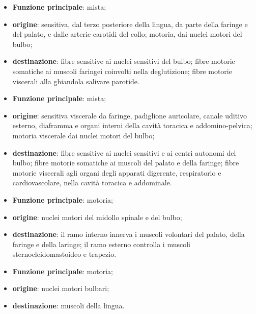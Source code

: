 \begin{itemize}
  \item \textbf{Funzione principale}: mista;
  \item \textbf{origine}: sensitiva, dal terzo posteriore della lingua, da
    parte della faringe e del palato, e dalle arterie carotidi del collo;
    motoria, dai nuclei motori del bulbo;
  \item \textbf{destinazione}: fibre sensitive ai nuclei sensitivi del
    bulbo; fibre motorie somatiche ai muscoli faringei coinvolti nella
    deglutizione; fibre motorie viscerali alla ghiandola salivare parotide.
\end{itemize}

\begin{itemize}
  \item \textbf{Funzione principale}: mista;
  \item \textbf{origine}: sensitiva viscerale da faringe, padiglione
    auricolare, canale uditivo esterno, diaframma e organi interni della
    cavità toracica e addomino-pelvica; motoria viscerale dai nuclei motori
    del bulbo;
  \item \textbf{destinazione}: fibre sensitive ai nuclei sensitivi e ai
    centri autonomi del bulbo; fibre motorie somatiche ai muscoli del
    palato e della faringe; fibre motorie viscerali agli organi degli
    apparati digerente, respiratorio e cardiovascolare, nella cavità
    toracica e addominale.
\end{itemize}

\begin{itemize}
  \item \textbf{Funzione principale}: motoria;
  \item \textbf{origine}: nuclei motori del midollo spinale e del bulbo;
  \item \textbf{destinazione}: il ramo interno innerva i muscoli volontari
    del palato, della faringe e della laringe; il ramo esterno controlla i
    muscoli sternocleidomastoideo e trapezio.
\end{itemize}

\begin{itemize}
  \item \textbf{Funzione principale}: motoria;
  \item \textbf{origine}: nuclei motori bulbari;
  \item \textbf{destinazione}: muscoli della lingua.
\end{itemize}
